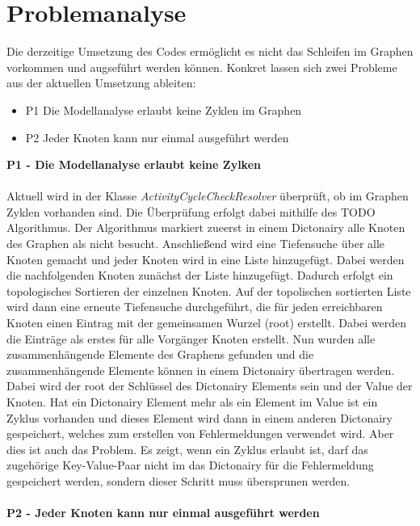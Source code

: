     \section{Problemanalyse}
    \label{Problemanalyse}
        Die derzeitige Umsetzung des Codes ermöglicht es nicht das Schleifen im Graphen vorkommen und augseführt werden können. 
        Konkret lassen sich zwei Probleme aus der aktuellen Umsetzung ableiten:
        \begin{itemize}
            \item P1 Die Modellanalyse erlaubt keine Zyklen im Graphen
            \item P2 Jeder Knoten kann nur einmal ausgeführt werden
        \end{itemize}
        \textbf{P1 - Die Modellanalyse erlaubt keine Zylken}\\
        \\
        Aktuell wird in der Klasse \textit{ActivityCycleCheckResolver} überprüft, ob im Graphen Zyklen vorhanden sind. 
        Die Überprüfung erfolgt dabei mithilfe des TODO Algorithmus.
        Der Algorithmus markiert zueerst in einem Dictonairy alle Knoten des Graphen als nicht besucht. 
        Anschließend wird eine Tiefensuche über alle Knoten gemacht und jeder Knoten wird in eine Liste hinzugefügt. 
        Dabei werden die nachfolgenden Knoten zunächst der Liste hinzugefügt. 
        Dadurch erfolgt ein topologisches Sortieren der einzelnen Knoten.
        Auf der topolischen sortierten Liste wird dann eine erneute Tiefensuche durchgeführt, die für jeden erreichbaren Knoten einen Eintrag mit der gemeinsamen Wurzel (root) erstellt. 
        Dabei werden die Einträge als erstes für alle Vorgänger Knoten erstellt.
        Nun wurden alle zusammenhängende Elemente des Graphens gefunden und die zusammenhängende Elemente können in einem Dictonairy übertragen werden. 
        Dabei wird der root der Schlüssel des Dictonairy Elements sein und der Value der Knoten. %
        Hat ein Dictonairy Element mehr als ein Element im Value ist ein Zyklus vorhanden und dieses Element wird dann in einem anderen Dictonairy gespeichert, welches zum erstellen von Fehlermeldungen verwendet wird.
        Aber dies ist auch das Problem. 
        Es zeigt, wenn ein Zyklus erlaubt ist, darf das zugehörige Key-Value-Paar nicht im das Dictonairy für die Fehlermeldung gespeichert werden, sondern dieser Schritt muss übersprunen werden.\\
        \\
        \textbf{P2 - Jeder Knoten kann nur einmal ausgeführt werden}\\
